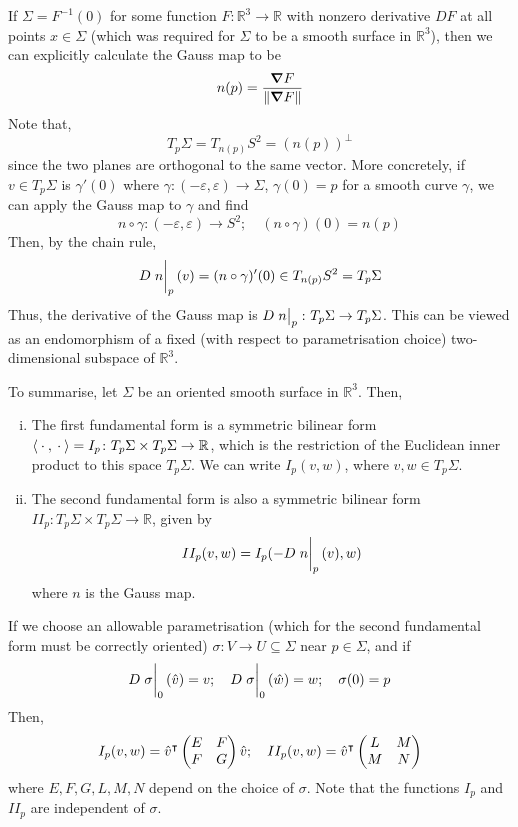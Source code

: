 \begin{remark}
	If \( \Sigma = F^{-1}(0) \) for some function \( F \colon \mathbb R^3 \to \mathbb R \) with nonzero derivative \( DF \) at all points \( x \in \Sigma \) (which was required for \( \Sigma \) to be a smooth surface in \( \mathbb R^3 \)), then we can explicitly calculate the Gauss map to be
	\[ n(p) = \frac{\grad F}{\norm{\grad F}} \]
	Note that,
	\[ T_p \Sigma = T_{n(p)} S^2 = (n(p))^\perp \]
	since the two planes are orthogonal to the same vector.
	More concretely, if \( v \in T_p \Sigma \) is \( \gamma'(0) \) where \( \gamma \colon (-\varepsilon, \varepsilon) \to \Sigma \), \( \gamma(0) = p \) for a smooth curve \( \gamma \), we can apply the Gauss map to \( \gamma \) and find
	\[ n \circ \gamma \colon (-\varepsilon, \varepsilon) \to S^2;\quad (n \circ \gamma)(0) = n(p) \]
	Then, by the chain rule,
	\[ D\eval{n}_p(v) = (n \circ \gamma)'(0) \in T_{n(p)} S^2 = T_p \Sigma \]
	Thus, the derivative of the Gauss map is \( D\eval{n}_p \colon T_p \Sigma \to T_p \Sigma \).
	This can be viewed as an endomorphism of a fixed (with respect to parametrisation choice) two-dimensional subspace of \( \mathbb R^3 \).

	To summarise, let \( \Sigma \) be an oriented smooth surface in \( \mathbb R^3 \).
	Then,
	\begin{enumerate}[(i)]
		\item The first fundamental form is a symmetric bilinear form \( \left\langle{{}\cdot{},{}\cdot{}}\right\rangle = I_p \colon T_p \Sigma \times T_p \Sigma \to \mathbb R \), which is the restriction of the Euclidean inner product to this space \( T_p \Sigma \).
			We can write \( I_p(v,w) \), where \( v, w \in T_p \Sigma \).
		\item The second fundamental form is also a symmetric bilinear form \( II_p \colon T_p \Sigma \times T_p \Sigma \to \mathbb R \), given by
			\[ II_p(v,w) = I_p(-D\eval{n}_p(v), w) \]
			where \( n \) is the Gauss map.
	\end{enumerate}
	If we choose an allowable parametrisation (which for the second fundamental form must be correctly oriented) \( \sigma \colon V \to U \subseteq \Sigma \) near \( p \in \Sigma \), and if
	\[ D \eval{\sigma}_0(\hat v) = v;\quad D \eval{\sigma}_0(\hat w) = w;\quad \sigma(0) = p \]
	Then,
	\[ I_p(v,w) = {\hat v}^\intercal \begin{pmatrix}
		E & F \\
		F & G
	\end{pmatrix} \hat v;\quad II_p(v,w) = {\hat v}^\intercal \begin{pmatrix}
		L & M \\
		M & N
	\end{pmatrix} \]
	where \( E, F, G, L, M, N \) depend on the choice of \( \sigma \).
	Note that the functions \( I_p \) and \( II_p \) are independent of \( \sigma \).
\end{remark}
